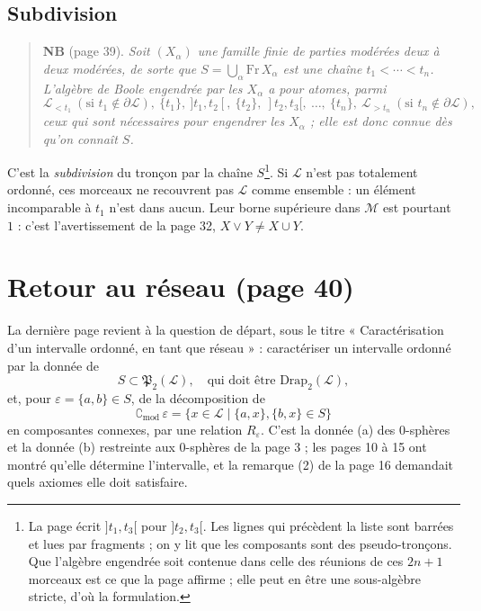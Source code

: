 \documentclass[11pt,a4paper]{article}
\begin{document}
\subsection*{Subdivision}

\begin{quote}
\textbf{NB} (page 39). \emph{Soit $(X_{\alpha})$ une famille finie de parties
modérées deux à deux modérées, de sorte que $S = \bigcup_{\alpha} \mathrm{Fr}\,
X_{\alpha}$ est une chaîne $t_{1} < \cdots < t_{n}$. L'algèbre de Boole
engendrée par les $X_{\alpha}$ a pour atomes, parmi}
\[
\mathcal{L}_{<t_{1}}\ (\text{si } t_{1} \notin \partial \mathcal{L}),\
\{t_{1}\},\ ]t_{1}, t_{2}[,\ \{t_{2}\},\ ]t_{2}, t_{3}[,\ \dots,\ \{t_{n}\},\
\mathcal{L}_{>t_{n}}\ (\text{si } t_{n} \notin \partial \mathcal{L}),
\]
\emph{ceux qui sont nécessaires pour engendrer les $X_{\alpha}$ ; elle est
donc connue dès qu'on connaît $S$.}
\end{quote}

C'est la \emph{subdivision} du tronçon par la chaîne $S$\footnote{La page écrit
$]t_{1}, t_{3}[$ pour $]t_{2}, t_{3}[$. Les lignes qui précèdent la liste sont
barrées et lues par fragments ; on y lit que les composants sont des
pseudo-tronçons. Que l'algèbre engendrée soit contenue dans celle des réunions
de ces $2n + 1$ morceaux est ce que la page affirme ; elle peut en être une
sous-algèbre stricte, d'où la formulation.}. Si $\mathcal{L}$ n'est pas
totalement ordonné, ces morceaux ne recouvrent pas $\mathcal{L}$ comme ensemble
: un élément incomparable à $t_{1}$ n'est dans aucun. Leur borne supérieure dans
$\mathcal{M}$ est pourtant $1$ : c'est l'avertissement de la page 32,
$X \vee Y \neq X \cup Y$.

\section*{Retour au réseau (page 40)}

La dernière page revient à la question de départ, sous le titre
« Caractérisation d'un intervalle ordonné, en tant que réseau » : caractériser
un intervalle ordonné par la donnée de
\[
S \subset \mathfrak{P}_{2}(\mathcal{L}), \quad \text{qui doit être }
\mathrm{Drap}_{2}(\mathcal{L}),
\]
et, pour $\varepsilon = \{a,b\} \in S$, de la décomposition de
\[
\complement_{\mathrm{mod}}\, \varepsilon = \{x \in \mathcal{L} \mid \{a,x\},
\{b,x\} \in S\}
\]
en composantes connexes, par une relation $R_{\varepsilon}$. C'est la donnée
(a)
 des 0-sphères et la donnée (b) restreinte aux 0-sphères de la
page 3 ; les pages 10 à 15 ont montré qu'elle détermine l'intervalle, et la
remarque (2) de la page 16 demandait quels axiomes elle doit satisfaire.
\end{document}

